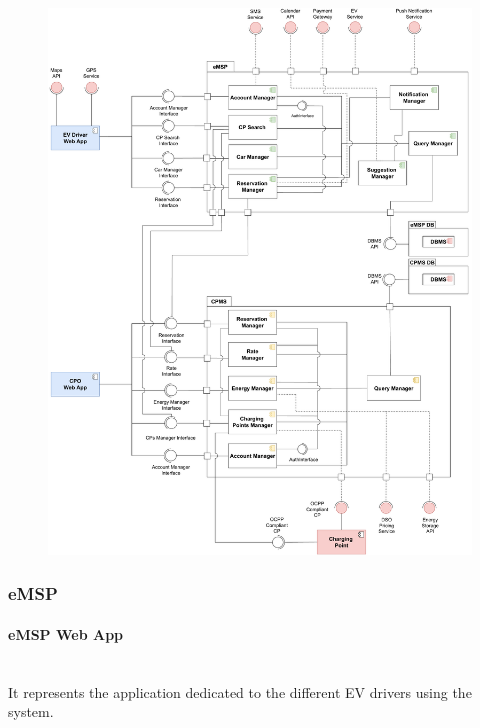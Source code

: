 \begin{figure}[H]
    \centering
    \includegraphics[scale=0.43]{src/ComponentDiagram/component_diagram.pdf}
\end{figure} \vspace{1cm}
\subsubsection{eMSP}

\paragraph*{eMSP Web App} \hfill \\
It represents the application dedicated to the different EV drivers using the system.

